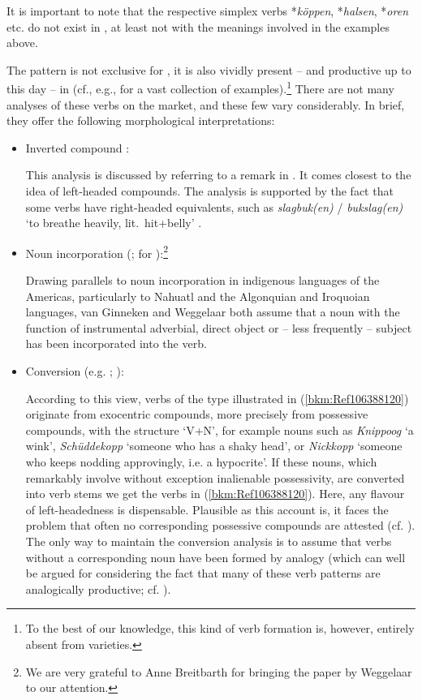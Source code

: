 \documentclass[output=paper
  ,nobabel
  ,draftmode
  ,colorlinks, citecolor=brown
]{langscibook}
\begin{document}
\noindent
It is important to note that the respective simplex verbs *\emph{köppen}, *\emph{halsen},
*\emph{oren} etc. do not exist in , at least not with the meanings involved in the
examples above.

The pattern is not exclusive for , it is also vividly present – and productive up to this
day – in  (cf., e.g., \citealt{AsdahlHolmberg1973} for a vast collection of
examples).\footnote{To the best of our knowledge, this kind of verb formation is, however, entirely
  absent from  varieties.} There are not many analyses of these verbs on the market, and
these few vary considerably. In brief, they offer the following morphological interpretations:


\begin{itemize}
\item Inverted compound \citep{Henzen1965}:

This analysis is discussed by \citet[55--56]{AsdahlHolmberg1973} referring to a remark in
. It comes closest to the idea of left-headed compounds. The
analysis is supported by the fact that some verbs have right-headed equivalents, such as
\emph{slagbuk(en)} / \emph{bukslag(en)} `to breathe heavily, lit.\ hit+belly' \citep[53, 56]{AsdahlHolmberg1973}.

\largerpage
\item Noun incorporation (\citealt[Section~2]{vanGinneken1939}; \citealt{Weggelaar1986} for
  ):\footnote{We are very grateful to Anne Breitbarth for bringing the paper by Weggelaar
    to our attention.} 

Drawing parallels to noun incorporation in indigenous languages of the Americas, particularly to
Nahuatl and the Algonquian and Iroquoian languages, van Ginneken and Weggelaar both assume that a
noun with the function of instrumental adverbial, direct object or – less frequently – subject has
been incorporated into the verb.  

\item Conversion (e.g. \citealt[32--37]{Weise1920}; \citealt{AsdahlHolmberg1973}):

According to this view, verbs of the type illustrated in (\ref{bkm:Ref106388120}) originate from
exocentric compounds, more precisely from possessive compounds, with the structure `V+N', for
example nouns such as \emph{Knippoog} `a wink', \emph{Schüddekopp} `someone who has a shaky head',
or \emph{Nickkopp} `someone who keeps nodding approvingly, i.e. a hypocrite'. If these nouns, which
remarkably involve without exception inalienable possessivity, are converted into verb stems we get
the verbs in (\ref{bkm:Ref106388120}). Here, any flavour of left-headedness is
dispensable. Plausible as this account is, it faces the problem that often no corresponding
possessive compounds are attested (cf. \citealt[304]{Weggelaar1986}). The only way to maintain the
conversion analysis is to assume that verbs without a corresponding noun have been formed by analogy
(which can well be argued for considering the fact that many of these verb patterns are analogically
productive; cf. \citealt{AsdahlHolmberg1973}). 

\end{itemize}
\end{document}
